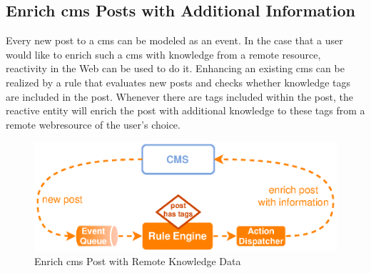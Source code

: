 \subsection{Enrich \textrm{\acrshort{cms}} Posts with Additional Information}
Every new post to a \textrm{\acrlong{cms}} can be modeled as an event.
In the case that a user would like to enrich such a \textrm{\acrshort{cms}} with knowledge from a remote resource, reactivity in the Web can be used to do it.
Enhancing an existing \textrm{\acrshort{cms}} can be realized by a rule that evaluates new posts and checks whether knowledge tags are included in the post.
Whenever there are tags included within the post, the reactive entity will enrich the post with additional knowledge to these tags from a remote \textrm{\gls{webresource}} of the user's choice.
\begin{figure}[!ht]
  \centering
  \includegraphics{figures/ProBinderAnnotations}
  \caption{Enrich \acrshort{cms} Post with Remote Knowledge Data}
  \label{fig:ProBinderAnnotations}
\end{figure}



